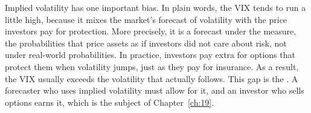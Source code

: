 Implied volatility has one important bias. In plain words, the VIX tends to run a little high, because it mixes the market's forecast of volatility with the price investors pay for protection. More precisely, it is a forecast under the \emph{\label{kt:risk-neutral}} measure, the probabilities that price assets as if investors did not care about risk, not under real-world probabilities. In practice, investors pay extra for options that protect them when volatility jumps, just as they pay for insurance. As a result, the VIX usually exceeds the volatility that actually follows. This gap is the . A forecaster who uses implied volatility must allow for it, and an investor who sells options earns it, which is the subject of Chapter~\ref{ch:19}.

